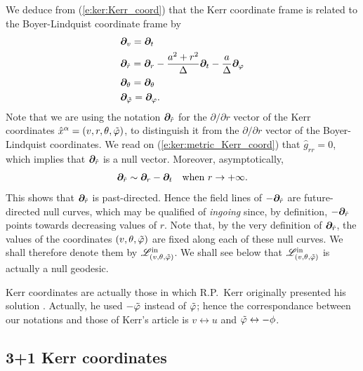 We deduce from (\ref{e:ker:Kerr_coord}) that the Kerr coordinate frame
is related to the Boyer-Lindquist coordinate frame by
\begin{subequations}
\label{e:ker:frame_Kerr_BL}
\begin{align}
    & \bm{\partial}_v = \bm{\partial}_t \\
    & \bm{\partial}_{\hat{r}} = \bm{\partial}_r - \frac{a^2+r^2}{\Delta} \bm{\partial}_t
                        - \frac{a}{\Delta} \bm{\partial}_\varphi \\
    & \bm{\partial}_\theta = \bm{\partial}_\theta \\
    & \bm{\partial}_{{\tilde\varphi}} = \bm{\partial}_\varphi .
\end{align}
\end{subequations}
Note that we are using the notation $\bm{\partial}_{\hat{r}}$ for the $\partial/\partial r$
vector of the Kerr coordinates $\hat{x}^\alpha = (v,r,\theta,{\tilde\varphi})$, to distinguish
it from the $\partial/\partial r$ vector of the Boyer-Lindquist coordinates.
We read on (\ref{e:ker:metric_Kerr_coord}) that $\hat{g}_{rr} = 0$, which
implies that $\bm{\partial}_{\hat{r}}$ is a null vector. Moreover, asymptotically,
\[
    \bm{\partial}_{\hat{r}} \sim \bm{\partial}_r - \bm{\partial}_t \quad\mbox{when}\
            r \rightarrow +\infty .
\]
This shows that $\bm{\partial}_{\hat{r}}$ is past-directed. Hence the field lines
of $-\bm{\partial}_{\hat{r}}$ are future-directed null curves,
which may be qualified of \emph{ingoing} since, by definition, $-\bm{\partial}_{\hat{r}}$ points towards
decreasing values of $r$. Note that, by the very definition of $\bm{\partial}_{\hat{r}}$,
the values of the coordinates $(v,\theta,{\tilde\varphi})$ are fixed along each of these
null curves. We shall therefore denote them by $\mathscr{L}^{\rm in}_{(v,\theta,{\tilde\varphi})}$.
We shall see below that $\mathscr{L}^{\rm in}_{(v,\theta,{\tilde\varphi})}$ is actually a null geodesic.


\begin{hist}
Kerr coordinates are actually those in which R.P.~Kerr originally presented his
solution \cite{Kerr63}. Actually, he used $-{\tilde\varphi}$ instead of ${\tilde\varphi}$; hence
the correspondance between our notations and those of Kerr's article \cite{Kerr63}
is $v\leftrightarrow u$ and ${\tilde\varphi}\leftrightarrow -\phi$.
\end{hist}

\subsection{3+1 Kerr coordinates}

